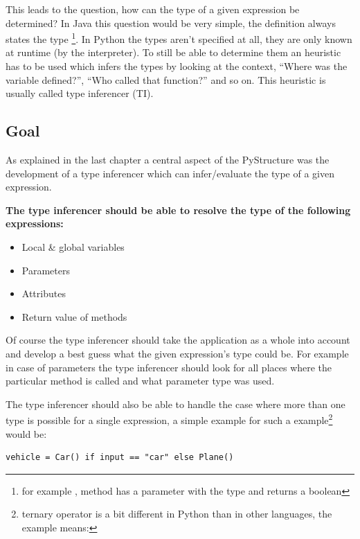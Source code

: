\documentclass[12pt,halfparskip]{scrreprt}
\begin{document}
This leads to the question, how can the type of a given expression be determined? In Java this question would be very simple, the definition always states the type \footnote{for example , method  has a parameter  with the type  and returns a boolean}. In Python the types aren't specified at all, they are only known at runtime (by the interpreter). To still be able to determine them an heuristic has to be used which infers the types by looking at the context, ``Where was the variable defined?'', ``Who called that function?'' and so on. This heuristic is usually called type inferencer (TI).

\subsection{Goal}

As explained in the last chapter a central aspect of the PyStructure was the development of a type inferencer which can infer/evaluate the type of a given expression. 

\textbf{The type inferencer should be able to resolve the type of the following expressions:}
\begin{itemize}
	\item Local \& global variables
	\item Parameters
	\item Attributes
	\item Return value of methods
\end{itemize}

Of course the type inferencer should take the application as a whole into account and develop a best guess what the given expression's type could be. For example in case of parameters the type inferencer should look for all places where the particular method is called and what parameter type was used.

The type inferencer should also be able to handle the case where more than one type is possible for a single expression, a simple example for such a example\footnote{ternary operator is a bit different in Python than in other languages, the example means: } would be: 

\begin{lstlisting}
vehicle = Car() if input == "car" else Plane()
\end{lstlisting}
\end{document}
